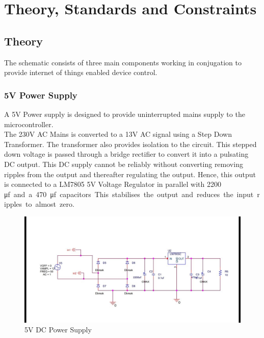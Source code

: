 \chapter{Theory, Standards and Constraints}
        \section{Theory}
        
        The schematic consists of three main components working in conjugation to provide internet of things enabled device control.
        
        \subsection{5V Power Supply}
        	A 5V Power supply is designed to provide uninterrupted mains supply to the microcontroller.\\
        	The 230V AC Mains is converted to a 13V AC signal using a Step Down Transformer. The transformer also provides isolation to the circuit. This stepped down voltage is passed through a bridge rectifier to convert it into a pulsating DC output. This DC supply cannot be reliably without converting removing ripples from the output and thereafter regulating the output. Hence, this output is connected to a LM7805 5V Voltage Regulator in parallel with 2200 \si\micro f and a 470 \si\micro f capacitors. This stabilises the output and reduces the input ripples to almost zero.
        	
        	\begin{figure}[h!]
        		\includegraphics[width=\textwidth]{photos/ckt-dgm/5VDCPowerSupply.jpg}
        		\caption{5V DC Power Supply}
        	\end{figure}
        	

